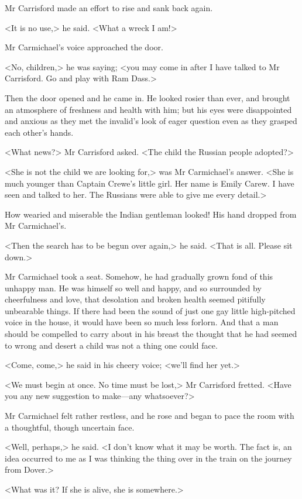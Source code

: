 Mr Carrisford made an effort to rise and sank back again.

<It is no use,> he said. <What a wreck I am!>

Mr Carmichael's voice approached the door.

<No, children,> he was saying; <you may come in after I have talked to Mr Carrisford. Go and play with Ram Dass.>

Then the door opened and he came in. He looked rosier than ever, and brought an atmosphere of freshness and health with him; but his eyes were disappointed and anxious as they met the invalid's look of eager question even as they grasped each other's hands.

<What news?> Mr Carrisford asked. <The child the Russian people adopted?>

<She is not the child we are looking for,> was Mr Carmichael's answer. <She is much younger than Captain Crewe's little girl. Her name is Emily Carew. I have seen and talked to her. The Russians were able to give me every detail.>

How wearied and miserable the Indian gentleman looked! His hand dropped from Mr Carmichael's.

<Then the search has to be begun over again,> he said. <That is all. Please sit down.>

Mr Carmichael took a seat. Somehow, he had gradually grown fond of this unhappy man. He was himself so well and happy, and so surrounded by cheerfulness and love, that desolation and broken health seemed pitifully unbearable things. If there had been the sound of just one gay little high-pitched voice in the house, it would have been so much less forlorn. And that a man should be compelled to carry about in his breast the thought that he had seemed to wrong and desert a child was not a thing one could face.

<Come, come,> he said in his cheery voice; <we'll find her yet.>

<We must begin at once. No time must be lost,> Mr Carrisford fretted. <Have you any new suggestion to make—any whatsoever?>

Mr Carmichael felt rather restless, and he rose and began to pace the room with a thoughtful, though uncertain face.

<Well, perhaps,> he said. <I don't know what it may be worth. The fact is, an idea occurred to me as I was thinking the thing over in the train on the journey from Dover.>

<What was it? If she is alive, she is somewhere.>

